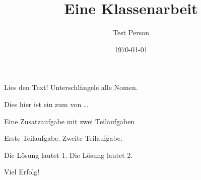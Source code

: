 \documentclass[a4paper]{scrartcl}
\author{Test Person}
\date{\today}
\title{Eine Klassenarbeit}
\begin{document}
\begin{aufgabe}[points={2},bonus-points={3}]
    \blindtext
    \begin{teilaufgaben}
        \teilaufgabe Lies den Text!
        \teilaufgabe Unterschlängele alle Nomen.
    \end{teilaufgaben}
    \begin{loesung}
        Dies hier ist ein  zum  von \dots
    \end{loesung}
    \begin{erwartungen}
    \end{erwartungen}
\end{aufgabe}

\begin{aufgabe*}
    Eine Zusatzaufgabe mit zwei Teilaufgaben
    \begin{teilaufgaben}
        \teilaufgabe Erste Teilaufgabe.
        \teilaufgabe Zweite Teilaufgabe.
    \end{teilaufgaben}
    \begin{loesung*}
        \begin{teilaufgaben}
            \teilaufgabe Die Lösung lautet 1.
            \teilaufgabe Die Lösung lautet 2.
        \end{teilaufgaben}
    \end{loesung*}
    \begin{erwartungen}
    \end{erwartungen}
\end{aufgabe*}

\vspace{1cm}
{\Huge Viel Erfolg!}
\end{document}
